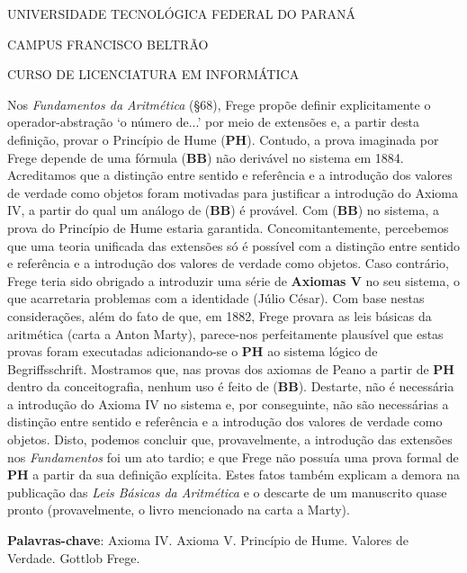 \documentclass[
	12pt,				%
	openright,			%
	oneside,			%
	a4paper,			%
	chapter=TITLE,		%
	english,			%
	french,				%
	spanish,			%
	brazil				%
	]{abntex2}
\renewcommand{\imprimircapa}{%
  \begin{capa}%
    \center
    \ABNTEXchapterfont\Large UNIVERSIDADE TECNOLÓGICA FEDERAL DO PARANÁ
    \par
    CAMPUS FRANCISCO BELTRÃO
    \par
    CURSO DE LICENCIATURA EM INFORMÁTICA
    
    {\vspace*{2cm} \ABNTEXchapterfont\large\imprimirautor}

    \vfill
    \begin{center}
    \ABNTEXchapterfont\bfseries\LARGE\imprimirtitulo
    \vspace*{3em}
    \end{center}
    \vfill
    
    \large\imprimirlocal

    \large\imprimirdata
    
    \vspace*{1cm}
  \end{capa}
}
\begin{document}


\imprimircapa

\imprimirfolhaderosto*




\setlength{\absparsep}{18pt} %
\begin{resumo} 
 Nos \textit{Fundamentos da Aritmética} (§68), Frege propõe definir explicitamente o operador-abstração `o número de...' por meio de extensões e, a partir desta definição, provar o Princípio de Hume (\textbf{PH}). Contudo, a prova imaginada por Frege depende de uma fórmula (\textbf{BB}) não derivável no sistema em 1884. Acreditamos que a distinção entre sentido e referência e a introdução dos valores de verdade como objetos foram motivadas para justificar a introdução do Axioma IV, a partir do qual um análogo de (\textbf{BB}) é provável. Com (\textbf{BB}) no sistema, a prova do Princípio de Hume estaria garantida. Concomitantemente, percebemos que uma teoria unificada das extensões só é possível com a distinção entre sentido e referência e a introdução dos valores de verdade como objetos. Caso contrário, Frege teria sido obrigado a introduzir uma série de \textbf{Axiomas V} no seu sistema, o que acarretaria problemas com a identidade (Júlio César). Com base nestas considerações, além do fato de que, em 1882, Frege provara as leis básicas da aritmética (carta a Anton Marty), parece-nos perfeitamente plausível que estas provas foram executadas adicionando-se o \textbf{PH} ao sistema lógico de Begriffsschrift. Mostramos que, nas provas dos axiomas de Peano a partir de \textbf{PH} dentro da conceitografia, nenhum uso é feito de (\textbf{BB}). Destarte, não é necessária a introdução do Axioma IV no sistema e, por conseguinte, não são necessárias a distinção entre sentido e referência e a introdução dos valores de verdade como objetos. Disto, podemos concluir que, provavelmente, a introdução das extensões nos \textit{Fundamentos} foi um ato tardio; e que Frege não possuía uma prova formal de \textbf{PH} a partir da sua definição explícita. Estes fatos também explicam a demora na publicação das \textit{Leis Básicas da Aritmética} e o descarte de um manuscrito quase pronto (provavelmente, o livro mencionado na carta a Marty). 
\vspace{\onelineskip} 

\noindent \textbf{Palavras-chave}: Axioma IV. Axioma V. Princípio de Hume. Valores de Verdade. Gottlob Frege. 
\end{resumo}
\end{document}
